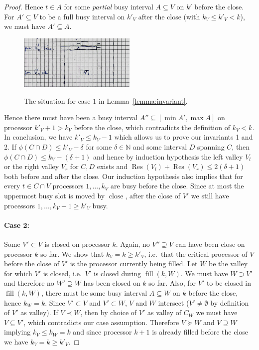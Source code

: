 \documentclass[a4paper]{article}
\DeclareMathOperator{\fillop}{fill}
\DeclareMathOperator{\close}{close}
\DeclareMathOperator{\res}{Res}
\begin{document}
\begin{proof}
      Hence $t \in A$ for some  \emph{partial} busy interval $A \subseteq V$ on $k'$ before the close.
      For $A' \subseteq V$ to be a full busy interval on $k'_V$ after the close (with $k_V \leq k'_V < k$), we must have $A' \subseteq A$.
      \begin{figure}[H]
        \centering
        \includegraphics[width=0.5\textwidth]{graphics/sketches/invariant_case1.png}\label{fig:invariant_case1}
        \caption{The situation for case $1$ in Lemma~\ref{lemma:invariant}.}
      \end{figure}
      Hence there must have been a busy interval $A'' \subseteq [\min A', \max A]$ on processor $k'_V + 1 > k_V$ before the close, which contradicts the definition of $k_V < k$.
      In conclusion, we have $k'_V \leq k_V - 1$ which allows us to prove our invariants 1 and 2.
      If $\phi(C \cap D) \leq k'_{V} - \delta$ for some $\delta \in \mathbb{N}$ and some interval $D$ spanning $C$, then $\phi(C \cap D) \leq k_V - (\delta + 1)$ and hence by induction hypothesis the left valley $V_l$ or the right valley $V_r$ for $C, D$ exists and $\res(V_l) + \res(V_r) \leq 2 (\delta + 1)$ both before and after the close.
      Our induction hypothesis also implies that for every $t \in C \cap V$ processors $1, \ldots, k_V$ are busy before the close.
      Since at most the uppermost busy slot is moved by $\close$, after the close of $V'$ we still have processors $1, \ldots, k_V - 1 \geq k'_V$ busy.

  \paragraph{Case 2:}
      Some $V' \subset V$ is closed on processor $k$.
      Again, no $V'' \supseteq V$ can have been close on processor $k$ so far.
      We show that $k_V = k \geq k'_V$, i.e.\ that the critical processor of $V$ before the close of $V'$ is the processor currently being filled.
      Let $W$ be the valley for which $V'$ is closed, i.e.\ $V'$ is closed during $\fillop(k, W)$.
      We must have $W \supset V'$ and therefore no $W' \supseteq W$ has been closed on $k$ so far.
      Also, for $V'$ to be closed in $\fillop(k, W)$, there must be some busy interval $A \subseteq W$ on $k$ before the close, hence $k_W = k$.
      Since $V' \subset V$ and $V' \subset W$, $V$ and $W$ intersect ($V' \neq \emptyset$ by definition of $V'$ as valley).
      If $V \prec W$, then by choice of $V'$ as valley of $C_W$
      we must have $V \subseteq V'$, which contradicts our case assumption.
      Therefore $V \succeq W$ and $V \supseteq W$ implying $k_V \leq k_W = k$ and since processor $k+1$ is already filled before the close we have $k_V = k \geq k'_V$.


\end{proof}
\end{document}
